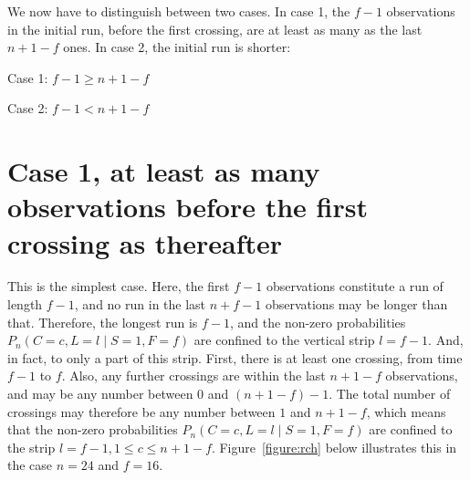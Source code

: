 We now have to distinguish between two cases. In case 1, the $f-1$ observations in the initial run,  before the first crossing, are at least as many as the last $n+1-f$ ones. In case 2, the initial run is shorter:

Case 1: $f-1 \geq n+1-f$

Case 2: $f-1<n+1-f$

\section{Case 1, at least as many observations before the first crossing as thereafter}

This is the simplest case. Here, the first $f-1$ observations constitute a run of length $f-1$, and no run in the last $n+f-1$ observations may be longer than that. Therefore, the longest run is $f-1$, and the non-zero probabilities $P_n (C=c,L=l \mid S=1,F=f)$ are confined to the vertical strip $l=f-1$. And, in fact, to only a part of this strip. First, there is at least one crossing, from time $f-1$ to $f$. Also, any further crossings are within the last $n+1-f$ observations, and may be any number between $0$ and $(n+1-f) - 1$. The total number of crossings may therefore be any number between $1$ and $n+1-f$, which means that the non-zero probabilities $P_n (C=c,L=l \mid S=1,F=f)$ are confined to the strip $l=f-1, 1 \leq c \leq n+1-f$. Figure~\ref{figure:rch} below illustrates this in the case $n=24$ and $f=16$.

